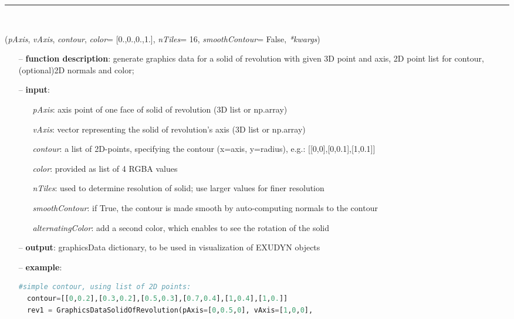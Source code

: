 \begin{itemize}[leftmargin=1.4cm]
\begin{itemize}[leftmargin=1.4cm]
\begin{itemize}[leftmargin=0.5cm]
\begin{itemize}[leftmargin=1.4cm]
\begin{itemize}[leftmargin=1.4cm]
\begin{itemize}[leftmargin=0.5cm]
\begin{itemize}[leftmargin=1.4cm]
\begin{itemize}[leftmargin=0.5cm]
%
\noindent\rule{8cm}{0.75pt}\vspace{1pt} \\ 
\begin{flushleft}
\label{sec:graphicsDataUtilities:GraphicsDataSolidOfRevolution}
({\it pAxis}, {\it vAxis}, {\it contour}, {\it color}= [0.,0.,0.,1.], {\it nTiles}= 16, {\it smoothContour}= False, {\it **kwargs})
\end{flushleft}
\setlength{\itemindent}{0.7cm}
\begin{itemize}[leftmargin=0.7cm]
\item[--]
{\bf function description}: generate graphics data for a solid of revolution with given 3D point and axis, 2D point list for contour, (optional)2D normals and color;
\item[--]
{\bf input}: \vspace{-6pt}
\begin{itemize}[leftmargin=1.2cm]
\setlength{\itemindent}{-0.7cm}
\item[]{\it pAxis}: axis point of one face of solid of revolution (3D list or np.array)
\item[]{\it vAxis}: vector representing the solid of revolution's axis (3D list or np.array)
\item[]{\it contour}: a list of 2D-points, specifying the contour (x=axis, y=radius), e.g.: [[0,0],[0,0.1],[1,0.1]]
\item[]{\it color}: provided as list of 4 RGBA values
\item[]{\it nTiles}: used to determine resolution of solid; use larger values for finer resolution
\item[]{\it smoothContour}: if True, the contour is made smooth by auto-computing normals to the contour
\item[]{\it alternatingColor}: add a second color, which enables to see the rotation of the solid
\end{itemize}
\item[--]
{\bf output}: graphicsData dictionary, to be used in visualization of EXUDYN objects
\item[--]
{\bf example}: \vspace{-12pt}\ei\begin{lstlisting}[language=Python, xleftmargin=36pt]
  #simple contour, using list of 2D points:
  contour=[[0,0.2],[0.3,0.2],[0.5,0.3],[0.7,0.4],[1,0.4],[1,0.]]
  rev1 = GraphicsDataSolidOfRevolution(pAxis=[0,0.5,0], vAxis=[1,0,0],

\end{lstlisting}
\end{itemize}
\end{itemize}
\end{itemize}
\end{itemize}
\end{itemize}
\end{itemize}
\end{itemize}
\end{itemize}
\end{itemize}
